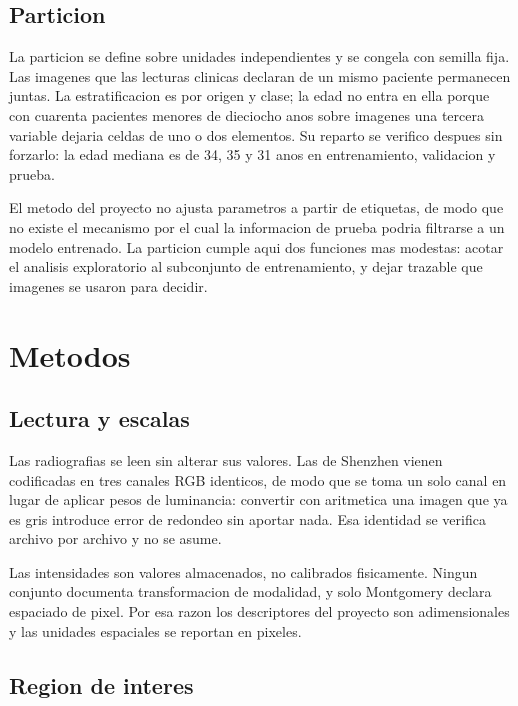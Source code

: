 \documentclass[11pt,a4paper]{article}
\begin{document}
\subsection{Particion}



La particion se define sobre unidades independientes y se congela con semilla
fija. Las imagenes que las lecturas clinicas declaran de un mismo paciente
permanecen juntas. La estratificacion es por origen y clase; la edad no entra
en ella porque con cuarenta pacientes menores de dieciocho anos sobre
\NImagenesTotal{} imagenes una tercera variable dejaria celdas de uno o dos
elementos. Su reparto se verifico despues sin forzarlo: la edad mediana es de
34, 35 y 31 anos en entrenamiento, validacion y prueba.

El metodo del proyecto no ajusta parametros a partir de etiquetas, de modo que
no existe el mecanismo por el cual la informacion de prueba podria filtrarse a
un modelo entrenado. La particion cumple aqui dos funciones mas modestas:
acotar el analisis exploratorio al subconjunto de entrenamiento, y dejar
trazable que imagenes se usaron para decidir.

\section{Metodos}

\subsection{Lectura y escalas}

Las radiografias se leen sin alterar sus valores. Las de Shenzhen vienen
codificadas en tres canales RGB identicos, de modo que se toma un solo canal
en lugar de aplicar pesos de luminancia: convertir con aritmetica una imagen
que ya es gris introduce error de redondeo sin aportar nada. Esa identidad se
verifica archivo por archivo y no se asume.

Las intensidades son valores almacenados, no calibrados fisicamente. Ningun
conjunto documenta transformacion de modalidad, y solo Montgomery declara
espaciado de pixel. Por esa razon los descriptores del proyecto son
adimensionales y las unidades espaciales se reportan en pixeles.

\subsection{Region de interes}
\end{document}
